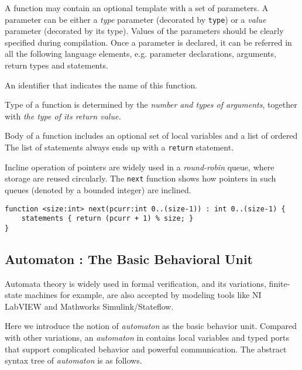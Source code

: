  A function may contain an optional template with a set of parameters. A parameter can be either a \emph{type} parameter (decorated by \texttt{type}) or a \emph{value} parameter (decorated by its type). Values of the parameters should be clearly specified during compilation. Once a parameter is declared, it can be referred in all the following language elements, e.g. parameter declarations, arguments, return types and statements.

 An identifier that indicates the name of this function.

 Type of a function is determined by the \emph{number and types of arguments}, together with \emph{the type of its return value.} 

 Body of a function includes an optional set of local variables and a list of ordered  The list of statements always ends up with a \texttt{return} statement.

\begin{example} Incline operation of pointers are widely used in a \emph{round-robin} queue, where storage are reused circularly. The \texttt{next} function shows how pointers in such queues (denoted by a bounded integer) are inclined. 
    \label{exp:successor_function}
    \begin{lstlisting}
function <size:int> next(pcurr:int 0..(size-1)) : int 0..(size-1) {
    statements { return (pcurr + 1) % size; }
}
    \end{lstlisting}
\end{example}

\subsection{Automaton : The Basic Behavioral Unit}

Automata theory is widely used in formal verification, and its variations, finite-state machines for example, are also accepted by modeling tools like NI LabVIEW and Mathworks Simulink/Stateflow.

Here we introduce the notion of \emph{automaton} as the basic behavior unit. Compared with other variations, an \emph{automaton} in \lang{} contains local variables and typed ports that support complicated behavior and powerful communication. The abstract syntax tree of \emph{automaton} is as follows.

